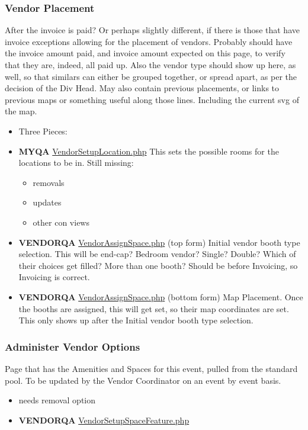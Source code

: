 \documentclass[captions=tablesignature]{scrartcl}
\begin{document}
\subsubsection{Vendor Placement}
\label{sec-3-1-12}
After the invoice is paid? Or perhaps slightly different, if there
is those that have invoice exceptions allowing for the placement
of vendors.  Probably should have the invoice amount paid, and
invoice amount expected on this page, to verify that they are,
indeed, all paid up.  Also the vendor type should show up here, as
well, so that similars can either be grouped together, or spread
apart, as per the decision of the Div Head. May also contain
previous placements, or links to previous maps or something useful
along those lines.  Including the current svg of the map.
\begin{itemize}
\item Three Pieces:
\end{itemize}
\begin{itemize}
\item {\bfseries\sffamily MYQA} \href{../webpages/VendorSetupLocation.php}{VendorSetupLocation.php}
\label{sec-3-1-12-1}
This sets the possible rooms for the locations to be in.
Still missing:
\begin{itemize}
\item removals
\item updates
\item other con views
\end{itemize}

\item {\bfseries\sffamily VENDORQA} \href{../webpages/VendorAssignSpace.php}{VendorAssignSpace.php} (top form)
\label{sec-3-1-12-2}
Initial vendor booth type selection.
This will be end-cap?  Bedroom vendor?  Single?  Double? Which of
their choices get filled? More than one booth? Should be before
Invoicing, so Invoicing is correct.

\item {\bfseries\sffamily VENDORQA} \href{../webpages/VendorAssignSpace.php}{VendorAssignSpace.php} (bottom form)
\label{sec-3-1-12-3}
Map Placement.
Once the booths are assigned, this will get set, so their map
coordinates are set.  This only shows up after the Initial vendor
booth type selection.
\end{itemize}

\subsubsection{Administer Vendor Options}
\label{sec-3-1-13}
Page that has the Amenities and Spaces for this event, pulled from
the standard pool.  To be updated by the Vendor Coordinator on an
event by event basis.
\begin{itemize}
\item needs removal option
\end{itemize}
\begin{itemize}
\item {\bfseries\sffamily VENDORQA} \href{../webpages/VendorSetupSpaceFeature.php}{VendorSetupSpaceFeature.php}
\label{sec-3-1-13-1}
\end{itemize}
\end{document}
